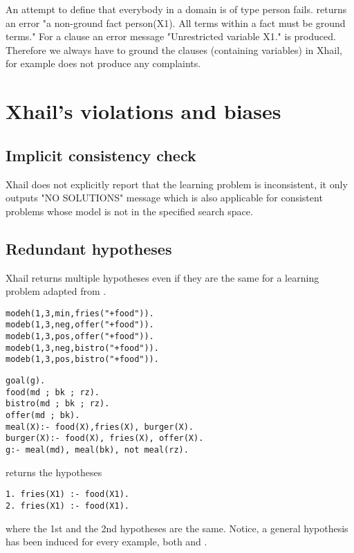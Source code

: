 An attempt to define that everybody in a domain is of type person fails.  returns an error "a non-ground fact person(X1). All terms within a fact must be ground terms." For a clause  an error message "Unrestricted variable X1." is produced. Therefore we always have to ground the clauses (containing variables) in Xhail, for example
 does not produce any complaints.
\section{Xhail's violations and biases}

\subsection{Implicit consistency check}\label{xhail_implicit_consistency_check}
Xhail does not explicitly report that the learning problem is inconsistent, it only outputs "NO SOLUTIONS" message which is also applicable for consistent problems whose model is not in the specified search space.

\subsection{Redundant hypotheses}\label{xhail_redundant_hypotheses}
Xhail returns multiple hypotheses even if they are the same for a learning problem adapted from \cite{ray2007xhail}.

\begin{minipage}[t]{.43\textwidth}
\begin{lstlisting}
modeh(1,3,min,fries("+food")).
modeb(1,3,neg,offer("+food")).
modeb(1,3,pos,offer("+food")).
modeb(1,3,neg,bistro("+food")).
modeb(1,3,pos,bistro("+food")).
\end{lstlisting}
\end{minipage}
\begin{minipage}[t]{.20\textwidth}
\begin{lstlisting}
goal(g).
food(md ; bk ; rz).
bistro(md ; bk ; rz).
offer(md ; bk).
meal(X):- food(X),fries(X), burger(X).
burger(X):- food(X), fries(X), offer(X).
g:- meal(md), meal(bk), not meal(rz).
\end{lstlisting}
\end{minipage}

returns the hypotheses

\begin{lstlisting}
1. fries(X1) :- food(X1).
2. fries(X1) :- food(X1).
\end{lstlisting}
where the 1st and the 2nd hypotheses are the same. Notice, a general hypothesis has been induced for every example, both  and .

